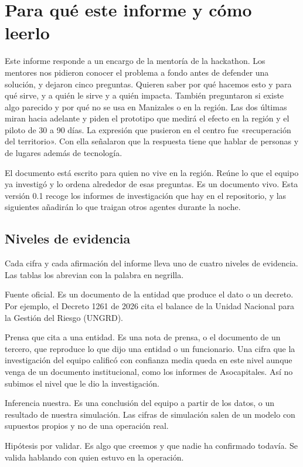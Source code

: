 \section{Para qué este informe y cómo leerlo}

Este informe responde a un encargo de la mentoría de la hackathon. Los mentores nos pidieron conocer el problema a fondo antes de defender una solución, y dejaron cinco preguntas. Quieren saber por qué hacemos esto y para qué sirve, y a quién le sirve y a quién impacta. También preguntaron si existe algo parecido y por qué no se usa en Manizales o en la región. Las dos últimas miran hacia adelante y piden el prototipo que medirá el efecto en la región y el piloto de 30 a 90 días. La expresión que pusieron en el centro fue «recuperación del territorio». Con ella señalaron que la respuesta tiene que hablar de personas y de lugares además de tecnología.

El documento está escrito para quien no vive en la región. Reúne lo que el equipo ya investigó y lo ordena alrededor de esas preguntas. Es un documento vivo. Esta versión 0.1 recoge los informes de investigación que hay en el repositorio, y las siguientes añadirán lo que traigan otros agentes durante la noche.

\subsection{Niveles de evidencia}

Cada cifra y cada afirmación del informe lleva uno de cuatro niveles de evidencia. Las tablas los abrevian con la palabra en negrilla.

\begin{description}[leftmargin=1.4em, style=nextline, itemsep=0.35em]
\item[\textsf{Oficial}.] Fuente oficial. Es un documento de la entidad que produce el dato o un decreto. Por ejemplo, el Decreto 1261 de 2026 cita el balance de la Unidad Nacional para la Gestión del Riesgo (UNGRD).
\item[\textsf{Prensa}.] Prensa que cita a una entidad. Es una nota de prensa, o el documento de un tercero, que reproduce lo que dijo una entidad o un funcionario. Una cifra que la investigación del equipo calificó con confianza media queda en este nivel aunque venga de un documento institucional, como los informes de Asocapitales. Así no subimos el nivel que le dio la investigación.
\item[\textsf{Inferencia}.] Inferencia nuestra. Es una conclusión del equipo a partir de los datos, o un resultado de nuestra simulación. Las cifras de simulación salen de un modelo con supuestos propios y no de una operación real.
\item[\textsf{Hipótesis}.] Hipótesis por validar. Es algo que creemos y que nadie ha confirmado todavía. Se valida hablando con quien estuvo en la operación.
\end{description}

